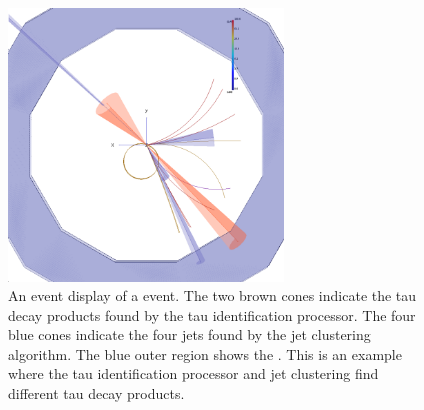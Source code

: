 


\begin{figure}[htbp]
\centering %
  \includegraphics[width=0.65\textwidth]{tau/NoTimeAnalysis/EvtDsp}
  \caption{An event display of a \eeZZQQ event. The two brown cones indicate the tau decay products found by the tau identification processor. The four blue cones indicate the four jets found by the jet clustering algorithm. The blue outer region shows the \HCAL. This is an example where the  tau identification processor and jet clustering find different tau decay products.}
  \label{fig:TauNTAevtDsp}
\end{figure}


